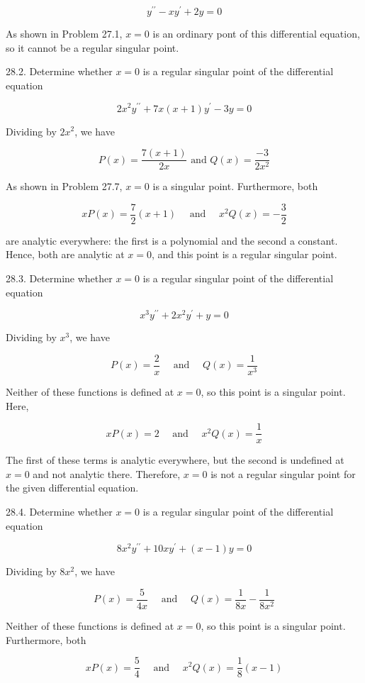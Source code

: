 \documentclass[10pt]{article}
\begin{document}
$$
y^{\prime \prime}-x y^{\prime}+2 y=0
$$

As shown in Problem 27.1, $x=0$ is an ordinary pont of this differential equation, so it cannot be a regular singular point.

28.2. Determine whether $x=0$ is a regular singular point of the differential equation

$$
2 x^{2} y^{\prime \prime}+7 x(x+1) y^{\prime}-3 y=0
$$

Dividing by $2 x^{2}$, we have

$$
P(x)=\frac{7(x+1)}{2 x} \text { and } Q(x)=\frac{-3}{2 x^{2}}
$$

As shown in Problem 27.7, $x=0$ is a singular point. Furthermore, both

$$
x P(x)=\frac{7}{2}(x+1) \quad \text { and } \quad x^{2} Q(x)=-\frac{3}{2}
$$

are analytic everywhere: the first is a polynomial and the second a constant. Hence, both are analytic at $x=0$, and this point is a regular singular point.

28.3. Determine whether $x=0$ is a regular singular point of the differential equation

$$
x^{3} y^{\prime \prime}+2 x^{2} y^{\prime}+y=0
$$

Dividing by $x^{3}$, we have

$$
P(x)=\frac{2}{x} \quad \text { and } \quad Q(x)=\frac{1}{x^{3}}
$$

Neither of these functions is defined at $x=0$, so this point is a singular point. Here,

$$
x P(x)=2 \quad \text { and } \quad x^{2} Q(x)=\frac{1}{x}
$$

The first of these terms is analytic everywhere, but the second is undefined at $x=0$ and not analytic there. Therefore, $x=0$ is not a regular singular point for the given differential equation.

28.4. Determine whether $x=0$ is a regular singular point of the differential equation

$$
8 x^{2} y^{\prime \prime}+10 x y^{\prime}+(x-1) y=0
$$

Dividing by $8 x^{2}$, we have

$$
P(x)=\frac{5}{4 x} \quad \text { and } \quad Q(x)=\frac{1}{8 x}-\frac{1}{8 x^{2}}
$$

Neither of these functions is defined at $x=0$, so this point is a singular point. Furthermore, both

$$
x P(x)=\frac{5}{4} \quad \text { and } \quad x^{2} Q(x)=\frac{1}{8}(x-1)
$$
\end{document}
